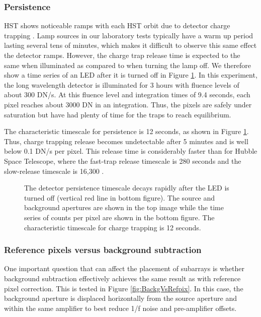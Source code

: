 \documentclass{aastex62}
\begin{document}
\subsubsection{Persistence}\label{sec:persistence}
HST shows noticeable ramps with each HST orbit due to detector charge trapping \citep{zhou2017chargeTrap}.
Lamp sources in our laboratory tests typically have a warm up period lasting several tens of minutes, which makes it difficult to observe this same effect the detector ramps.
However, the charge trap release time is expected to the same when illuminated as compared to when turning the lamp off.
We therefore show a time series of an LED after it is turned off in Figure \ref{fig:persistence}.
In this experiment, the long wavelength detector is illuminated for 3 hours with fluence levels of about 300 DN/s.
At this fluence level and integration times of 9.4 seconds, each pixel reaches about 3000 DN in an integration.
Thus, the pixels are safely under saturation but have had plenty of time for the traps to reach equilibrium.

The characteristic timescale for persistence is 12 seconds, as shown in Figure \ref{fig:persistence}.
Thus, charge trapping release becomes undetectable after 5 minutes and is well below 0.1 DN/s per pixel.
This release time is considerably faster than for Hubble Space Telescope, where the fast-trap release timescale is 280 seconds and the slow-release timescale is 16,300 \citep{zhou2017chargeTrap}.


\begin{figure}
{}
{}
\caption{The detector persistence timescale decays rapidly after the LED is turned off (vertical red line in bottom figure).
The source and background apertures are shown in the top image while the time series of counts per pixel are shown in the bottom figure.
The characteristic timescale for charge trapping is 12 seconds.}\label{fig:persistence}
\end{figure}


\clearpage
\subsubsection{Reference pixels versus background subtraction}
One important question that can affect the placement of subarrays is whether background subtraction effectively achieves the same result as with reference pixel correction.
This is tested in Figure \ref{fig:BackgVsRefpix}.
In this case, the background aperture is displaced horizontally from the source aperture and within the same amplifier to best reduce 1/f noise and pre-amplifier offsets.
\end{document}
